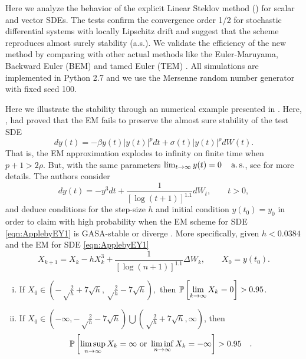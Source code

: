 Here we analyze the behavior of the explicit Linear Steklov method (\SM) for scalar and vector SDEs. 
The tests confirm the convergence order 1/2 for stochastic differential systems with locally Lipschitz drift 
and suggest that the \SM scheme reproduces almost surely stability (a.s.). We validate the efficiency of the new 
method  by comparing with other actual methods like the Euler-Maruyama, Backward Euler (BEM) \cite{Mao2013} and 
tamed 
Euler (TEM) \cite{Hutzenthaler2012a}. All simulations are implemented in Python 2.7 and we use the Mersenne random 
number generator with fixed seed 100.
	
\begin{example}

		Here we illustrate the stability  through an numerical example presented in 
	\cite[sec 7, pg. 420]{Appleby2010}. Here, \citeauthor{Appleby2010}, had proved that the EM fails to preserve the 
	almost 
	sure stability of the test SDE
	\begin{equation}
	dy(t)= -\beta y(t)|y(t)|^p dt +\sigma(t)|y(t)|^ {\rho} dW(t).
	\end{equation}
	That is, the EM approximation explodes to infinity on finite time when $p+1>2\rho$. But, with the same parameters
	$
	\lim_{t \to \infty} y(t)=0 \quad \operatorname*{a.s.}
	$, see \cite{Appleby2008, Appleby2010} for more details.
	The authors consider 
	\begin{equation}\label{eqn:ApplebyEY1}
		dy(t) = -y^3 dt 
		+ \frac{1}{\left[\log(t+1)\right]^{1.1}} dW_t, \qquad t>0,
	\end{equation}
	and deduce conditions for the step-size $h$ and initial condition $y(t_0)=y_0$ in order to claim with high 
	probability
	when the EM scheme for SDE \eqref{eqn:ApplebyEY1} is GASA-stable or diverge \cite[Cor 7.1 pg. 421]{Appleby2010}. 
	More specifically, given $h<\num{0.0384}$ and  the EM for SDE \eqref{eqn:ApplebyEY1}
	\begin{equation}\label{eqn:EMRecurrenceApplbyEY1}
		X_{k+1} = X_k -h X_k^3 
		+\frac{1}{[\log(n+1)]^{1.1}} \Delta W_k, \qquad X_0=y(t_0).
	\end{equation}
	\begin{enumerate}[(i)]
		\item
		If $
		\displaystyle
		X_0\in \left(
		-\sqrt\frac{2}{h} + 7 \sqrt h,
		\sqrt\frac{2}{h} - 7 \sqrt h
		\right),
		$
		then
		$
		\displaystyle
		\mathbb{P}\left[
			\lim_{k\to\infty}
			X_k = 0
		\right]>0.95
		$\quad.
		\item  
		If 
		$
		\displaystyle
		X_0\in \left(
		-\infty,
		-\sqrt\frac{2}{h} - 7 \sqrt h
		\right)
		\bigcup
		\left(
		\sqrt\frac{2}{h} + 7 \sqrt h,
		\infty
		\right)
		$,
		then 
		$$
		\displaystyle
		\mathbb{P}\left[
			\limsup_{n\to\infty}
			X_k = \infty
			\text{ or }
			\liminf_{n\to\infty}
			X_k = -\infty
		\right]>0.95 \quad.
		$$
		

\end{enumerate}
\end{example}
